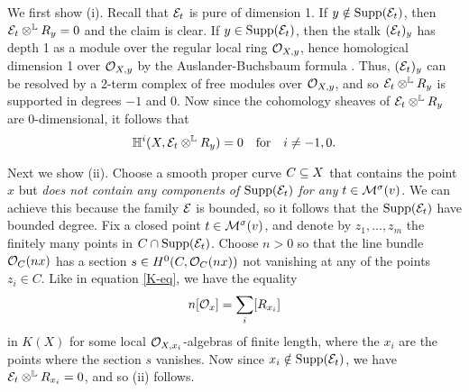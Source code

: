\documentclass[letterpaper,10pt]{article}
\theoremstyle{remark}
\begin{document}
We first show (i). Recall that $\mathcal{E}_t$ is pure of dimension 1. If $y \notin \operatorname{\mathrm{Supp}}(\mathcal{E}_t)$, then $\mathcal{E}_t \otimes^{\mathbb{L}} R_y = 0$ and the claim is clear. If $y \in \operatorname{\mathrm{Supp}}(\mathcal{E}_t)$, then the stalk $(\mathcal{E}_t)_y$ has depth 1 as a module over the regular local ring $\mathcal{O}_{X,y}$, hence homological dimension 1 over $\mathcal{O}_{X,y}$ by the Auslander-Buchsbaum formula \cite[equation (1.1)]{HL}. Thus, $(\mathcal{E}_t)_y$ can be resolved by a 2-term complex of free modules over $\mathcal{O}_{X,y}$, and so $\mathcal{E}_t \otimes^{\mathbb{L}} R_y$ is supported in degrees $-1$ and $0$. Now since the cohomology sheaves of $\mathcal{E}_t \otimes^{\mathbb{L}} R_y$ are 0-dimensional, it follows that 
\[ \mathbb{H}^i(X, \mathcal{E}_t \otimes^{\mathbb{L}} R_y) = 0 \quad \mathrm{for} \quad i \neq -1, 0. \]

Next we show (ii). Choose a smooth proper curve $C \subseteq X$ that contains the point $x$ but \emph{does not contain any components of} $\operatorname{\mathrm{Supp}}(\mathcal{E}_t)$ \emph{for any} $t \in \mathcal{M}^{\sigma}(v)$. We can achieve this because the family $\mathcal{E}$ is bounded, so it follows that the $\operatorname{\mathrm{Supp}}(\mathcal{E}_t)$ have bounded degree. Fix a closed point $t \in \mathcal{M}^\sigma(v)$, and denote by $z_1,\ldots,z_m$ the finitely many points in $C \cap \operatorname{\mathrm{Supp}}(\mathcal{E}_t)$. Choose $n > 0$ so that the line bundle $\mathcal{O}_C(n x)$ has a section $s \in H^0(C, \mathcal{O}_C(n x))$ not vanishing at any of the points $z_i \in C$. Like in equation \eqref{K-eq}, we have the equality
\[ n[\mathcal{O}_x] = \sum_i [R_{x_i}] \]
in $K(X)$ for some local $\mathcal{O}_{X,x_i}$-algebras of finite length, where the $x_i$ are the points where the section $s$ vanishes. Now since $x_i \notin \operatorname{\mathrm{Supp}}(\mathcal{E}_t)$, we have $\mathcal{E}_t \otimes^{\mathbb{L}} R_{x_i} = 0$, and so (ii) follows. 
\end{document}
